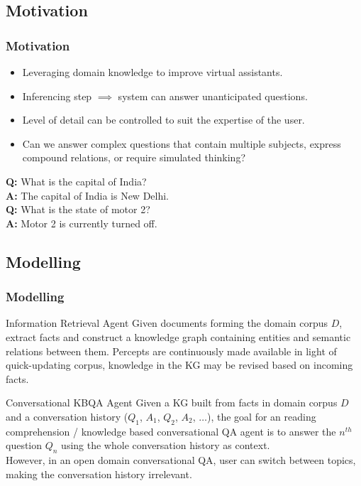 \documentclass[t]{beamer}
\begin{document}
\subsection{Motivation}
\begin{frame}
    \frametitle{Motivation}
    \begin{itemize}
    \item Leveraging domain knowledge to improve virtual assistants.
    \item Inferencing step $\implies$ system can answer unanticipated questions.
    \item Level of detail can be controlled to suit the expertise of the user.
    \item Can we answer complex questions that contain multiple subjects, express compound relations, or require simulated thinking?
    \end{itemize}
    
    \begin{example}
    \textbf{Q:} What is the capital of India?\\
    \textbf{A:} The capital of India is New Delhi.\\
    \textbf{Q:} What is the state of motor 2?\\
    \textbf{A:} Motor 2 is currently turned off.
    \end{example}
\end{frame}

\subsection{Modelling}
\begin{frame}
    \frametitle{Modelling}
    \begin{block}{Information Retrieval Agent}
    Given documents forming the domain corpus $D$, extract facts and construct a knowledge graph containing entities and semantic relations between them. Percepts are continuously made available in light of quick-updating corpus, knowledge in the KG may be revised based on incoming facts.
    \end{block}
    \begin{block}{Conversational KBQA Agent}
    Given a KG built from facts in domain corpus $D$ and a conversation history ($Q_1$, $A_1$, $Q_2$, $A_2$, $\ldots$), the goal for an reading comprehension / knowledge based conversational QA agent is to answer the $n^{th}$ question $Q_n$ using the whole conversation history as context.\\
    However, in an open domain conversational QA, user can switch between topics, making the conversation history irrelevant.
    \end{block}
\end{frame}
\end{document}
